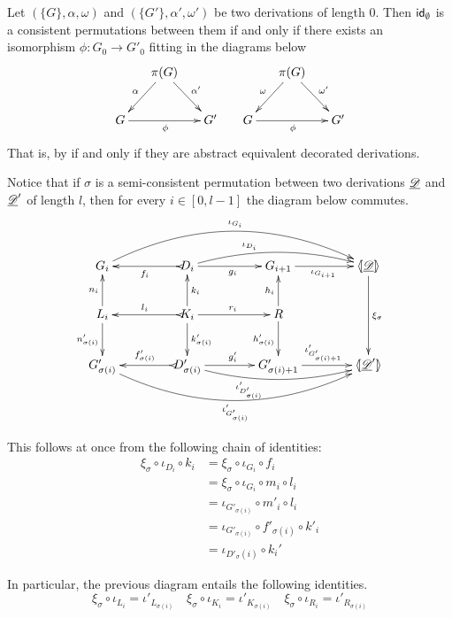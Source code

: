 \begin{example}\label{rem:empty2}
	Let $(\{G\}, \alpha, \omega)$ and $(\{G'\}, \alpha', \omega')$ be two derivations of length $0$. Then $\mathsf{id}_{\emptyset}$ is a consistent permutations between them if and only if there exists an isomorphism $\phi\colon G_0\to G'_0$ fitting in the diagrams below
	\[\xymatrix@C=15pt{&\pi(G) \ar[dr]^{\alpha'} \ar[dl]_{\alpha}&&& \pi(G) \ar[dr]^{\omega'} \ar[dl]_{\omega}\\ G\ar[rr]_{\phi} && G' &G \ar[rr]_{\phi} && G' } \]
	That is, by  if and only if they are abstract equivalent decorated derivations.
\end{example}


\begin{remark} \label{rem:coproj} Notice that if $\sigma$ is a semi-consistent permutation between two derivations  $\underline{\mathscr{D}}$ and $\underline{\mathscr{D}}'$ of length $l$, then for every  $i\in [0,l-1]$ the diagram below commutes.
	\[\xymatrix@C=40pt{G_i\ar@/^1cm/[rrr]^{\iota_{G_{i}}}&D_i\ar@/^.4cm/[rr]^(.35){\iota_{D_i}} \ar[r]_{g_i} \ar@{>->}[l]^{f_i}&G_{i+1} \ar[r]_{\iota_{G_{i+1}}}&\tpro{D} \ar[dd]^{\xi_\sigma}\\  L_i \ar[u]^{n_i} \ar[d]_{n'_{\sigma(i)}}& K_i \ar[d]^{k'_{\sigma(i)}} \ar[u]_{k_i} \ar[r]^{r_i} \ar@{>->}[l]_{l_i} &R\ar[u]^{h_i} \ar[d]_{h'_{\sigma(i)}}\\G'_{\sigma(i)}\ar@/_1cm/[rrr]_{\iota'_{G'_{\sigma(i)}}} &D'_{\sigma(i)}\ar@{>->}[l]_{f'_{\sigma(i)}} \ar[r]^{g'_i} \ar@/_.4cm/[rr]_(.35){\iota'_{D'_{\sigma(i)}}}&G'_{\sigma(i)+1} \ar[r]^{\iota'_{G'_{\sigma(i)+1}}}& \lpro\der{D}' \rpro }\]
	
	This follows at once from the following chain of identities:
	\begin{align*}
		\xi_\sigma \circ \iota_{D_i}\circ k_i&=\xi_\sigma \circ \iota_{G_{i}} \circ f_i\\&= \xi_\sigma \circ \iota_{G_{i}}\circ m_i \circ l_i\\&=\iota_{G'_{\sigma(i)}}\circ m'_i\circ l_i\\&=\iota_{G'_{\sigma(i)}}\circ f'_{\sigma(i)}\circ k'_i\\&=\iota_{D'_\sigma(i)}\circ k_i'
	\end{align*}
	
	In particular, the previous diagram entails the following identities.
	\[\xi_\sigma \circ \iota_{L_i}=\iota'_{L_{\sigma(i)}} \quad \xi_\sigma \circ \iota_{K_i}=\iota'_{K_{\sigma(i)}} \quad \xi_\sigma \circ \iota_{R_i}=\iota'_{R_{\sigma(i)}} \]
\end{remark}

